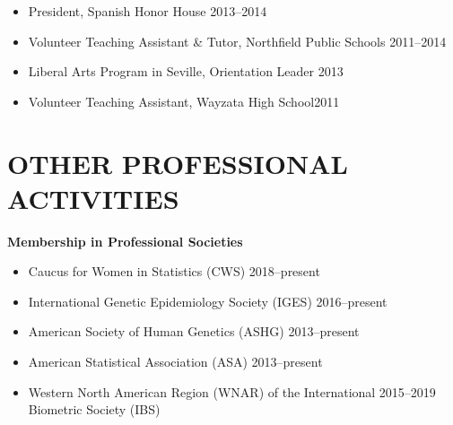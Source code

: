 \documentclass[margin]{res}
\begin{document}
\begin{resume}
\begin{itemize}
			\item President, Spanish Honor House \hfill 2013--2014
			
			\item Volunteer Teaching Assistant \& Tutor, Northfield Public Schools \hfill 2011--2014
			
			
			
			\item Liberal Arts Program in Seville, Orientation Leader \hfill 2013 
			
			
			
			\item Volunteer Teaching Assistant, Wayzata High School\hfill 2011 \\
\end{itemize}





\section{OTHER PROFESSIONAL \\ ACTIVITIES}  	

\hspace{0.1cm}\textbf{Membership in Professional Societies}
\begin{itemize}	 %
\item Caucus for Women in Statistics (CWS) \hfill 2018--present
\item International Genetic Epidemiology Society (IGES) \hfill 2016--present
\item American Society of Human Genetics (ASHG) \hfill 2013--present
\item American Statistical Association (ASA) \hfill 2013--present
\item Western North American Region (WNAR) of the International \hfill 2015--2019 \\  Biometric Society (IBS)  %
\end{itemize}
	

\end{resume}
\end{document}
